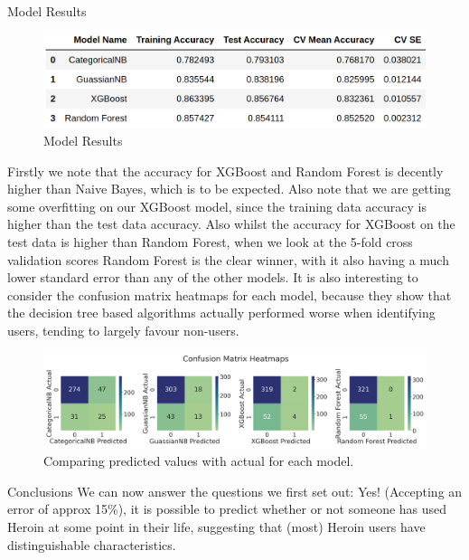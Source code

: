 \documentclass[6pt, final, xcolor=table]{beamer}
\newlength{\colwidth}
\begin{document}
\begin{frame}[t]
\begin{columns}[t]
\begin{column}{\colwidth}
\begin{block}{Model Results}
  \begin{figure}[h!]
    \centering
     \includegraphics[scale=1.3]{model_results.png}
    \caption{Model Results}
    \label{fig:method}
    \end{figure}  
    
Firstly we note that the accuracy for XGBoost and Random Forest is decently higher than
Naive Bayes, which is to be expected. Also note that we are getting some overfitting on our
XGBoost model, since the training data accuracy is higher than the test data accuracy.
Also whilst the accuracy for XGBoost on the test data is higher than Random Forest,
when we look at the 5-fold cross validation scores Random Forest is the clear winner,
with it also having a much lower standard error than any of the other models.
It is also interesting to consider the confusion matrix heatmaps for each model, because they show that the decision tree based algorithms actually performed worse when identifying users, tending to largely favour non-users.
 
  \begin{figure}[h!]
    \centering
     \includegraphics[scale=0.9]{conf_mat_heatmaps.png}
    \caption{Comparing predicted values with actual for each model.}
    \label{fig:conf_matrix}
    \end{figure}   

  \end{block}
  \begin{alertblock}{Conclusions}
We can now answer the questions we first set out:
Yes! (Accepting an error of approx 15\%), it is possible to predict whether or not
someone has used Heroin at some point in their life, suggesting
that (most) Heroin users have distinguishable characteristics.
  \end{alertblock}
  

\end{column}
\end{columns}
\end{frame}
\end{document}
